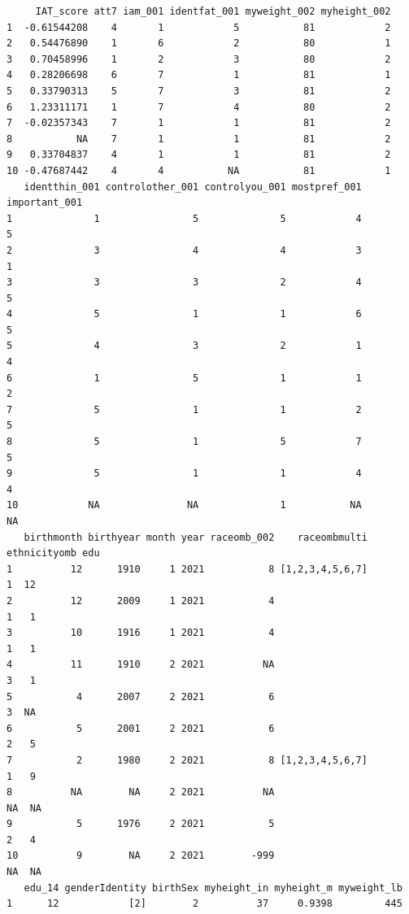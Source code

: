 \documentclass[
  letterpaper,
  DIV=11,
  numbers=noendperiod]{scrartcl}
\begin{document}
\begin{verbatim}
     IAT_score att7 iam_001 identfat_001 myweight_002 myheight_002
1  -0.61544208    4       1            5           81            2
2   0.54476890    1       6            2           80            1
3   0.70458996    1       2            3           80            2
4   0.28206698    6       7            1           81            1
5   0.33790313    5       7            3           81            2
6   1.23311171    1       7            4           80            2
7  -0.02357343    7       1            1           81            2
8           NA    7       1            1           81            2
9   0.33704837    4       1            1           81            2
10 -0.47687442    4       4           NA           81            1
   identthin_001 controlother_001 controlyou_001 mostpref_001 important_001
1              1                5              5            4             5
2              3                4              4            3             1
3              3                3              2            4             5
4              5                1              1            6             5
5              4                3              2            1             4
6              1                5              1            1             2
7              5                1              1            2             5
8              5                1              5            7             5
9              5                1              1            4             4
10            NA               NA              1           NA            NA
   birthmonth birthyear month year raceomb_002    raceombmulti ethnicityomb edu
1          12      1910     1 2021           8 [1,2,3,4,5,6,7]            1  12
2          12      2009     1 2021           4                            1   1
3          10      1916     1 2021           4                            1   1
4          11      1910     2 2021          NA                            3   1
5           4      2007     2 2021           6                            3  NA
6           5      2001     2 2021           6                            2   5
7           2      1980     2 2021           8 [1,2,3,4,5,6,7]            1   9
8          NA        NA     2 2021          NA                           NA  NA
9           5      1976     2 2021           5                            2   4
10          9        NA     2 2021        -999                           NA  NA
   edu_14 genderIdentity birthSex myheight_in myheight_m myweight_lb
1      12            [2]        2          37     0.9398         445

\end{verbatim}
\end{document}
